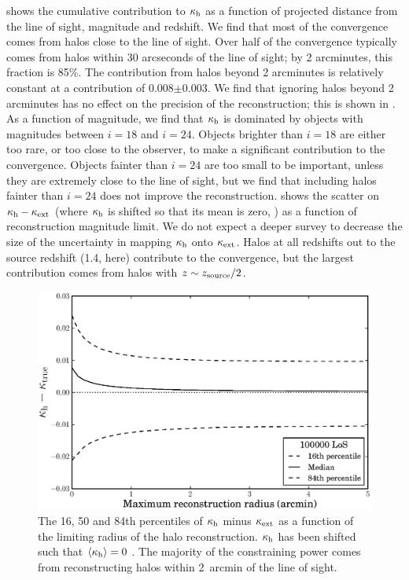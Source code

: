 \documentclass[useAMS,usenatbib,a4paper]{mn2e}
\begin{document}
 shows the cumulative contribution to $\kappa_{\rm h}$ as a function
of projected distance from the line of sight, magnitude and redshift. We find
that most of the convergence comes from halos close to the line of sight. 
Over half of the  convergence typically comes from halos within 30 arcseconds
of the line of sight; by 2 arcminutes, this fraction is 85\%. The contribution
from halos beyond 2 arcminutes is relatively constant at a contribution of
0.008$\pm$0.003. We find that ignoring halos beyond 2 arcminutes has no effect
on the precision of the reconstruction; this is shown in . As
a function of magnitude, we find that $\kappa_{\rm h}$ is dominated by objects with
magnitudes between $i=18$ and $i=24$. Objects brighter than $i=18$ are either
too rare, or too close to the observer, to make a significant contribution to
the convergence. Objects fainter than $i=24$ are too small to be important,
unless they are extremely close to the line of sight, but we find that
including halos fainter than $i=24$ does not improve the reconstruction. 
 shows the scatter on $\kappa_{\rm h}-\kappa_{\rm ext}$ (where $\kappa_{\rm h}$ is
shifted so that its mean is zero, ) as a function of reconstruction magnitude limit. We do not
expect a deeper survey to decrease the size of the uncertainty in mapping
$\kappa_{\rm h}$ onto $\kappa_{\rm ext}$. Halos at all redshifts out to the source redshift
(1.4, here) contribute to the convergence, but the largest contribution comes
from halos with $z \sim z_{\rm source}/2$.

\begin{figure}
\includegraphics[width=\columnwidth]{figs/radius_scatter.eps}
\caption[magcut]{The 16, 50 and 84th percentiles of $\kappa_{\rm h}$ minus
$\kappa_{\rm ext}$ as a function of the limiting radius of the halo
reconstruction. $\kappa_{\rm h}$ has been shifted such that
$\left\langle\kappa_{\rm h}\right\rangle=0$ . 
The majority of the constraining power
comes from reconstructing halos within 2~arcmin of the line of sight.}
\label{fig:radcut}
\end{figure}
\end{document}

